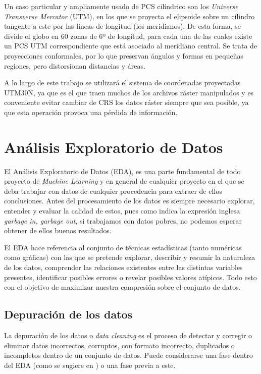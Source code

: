 \documentclass[12pt,a4paper,]{book}
\numberwithin{dummy}{section}
\theoremstyle{ocrenumbox}
\theoremstyle{blacknumex}
\theoremstyle{blacknumbox}
\theoremstyle{ocrenum}
\theoremstyle{ocrenum}
\begin{document}
Un caso particular y ampliamente usado de PCS cilíndrico son los
\emph{Universe Transverse Mercator} (UTM), en los que se proyecta el
elipsoide sobre un cilindro tangente a este por las líneas de longitud
(los meridianos). De esta forma, se divide el globo en 60 zonas de 6º de
longitud, para cada una de las cuales existe un PCS UTM correspondiente
que está asociado al meridiano central. Se trata de proyecciones
conformales, por lo que preservan ángulos y formas en pequeñas regiones,
pero distorsionan distancias y áreas.

A lo largo de este trabajo se utilizará el sistema de coordenadas
proyectadas UTM30N, ya que es el que traen muchos de los archivos ráster
manipulados y es conveniente evitar cambiar de CRS los datos ráster
siempre que sea posible, ya que esta operación provoca una pérdida de
información.

\hypertarget{anuxe1lisis-exploratorio-de-datos}{%
\section{Análisis Exploratorio de
Datos}\label{anuxe1lisis-exploratorio-de-datos}}

El Análisis Exploratorio de Datos (EDA), es una parte fundamental de
todo proyecto de \emph{Machine Learning} y en general de cualquier
proyecto en el que se deba trabajar con datos de cualquier procedencia
para extraer de ellos conclusiones. Antes del procesamiento de los datos
es siempre necesario explorar, entender y evaluar la calidad de estos,
pues como indica la expresión inglesa \emph{garbage in, garbage out}, si
trabajamos con datos pobres, no podemos esperar obtener de ellos buenos
resultados. \citep{wickham2016r}

El EDA hace referencia al conjunto de técnicas estadísticas (tanto
numéricas como gráficas) con las que se pretende explorar, describir y
resumir la naturaleza de los datos, comprender las relaciones existentes
entre las distintas variables presentes, identificar posibles errores o
revelar posibles valores atípicos. Todo esto con el objetivo de
maximizar nuestra compresión sobre el conjunto de datos.

\hypertarget{depuraciuxf3n-de-los-datos}{%
\subsection{Depuración de los datos}\label{depuraciuxf3n-de-los-datos}}

La depuración de los datos o \emph{data cleaning} es el proceso de
detectar y corregir o eliminar datos incorrectos, corruptos, con formato
incorrecto, duplicados o incompletos dentro de un conjunto de datos.
Puede considerarse una fase dentro del EDA (como se sugiere en
\citet{wickham2016r}) o una fase previa a este.
\end{document}
